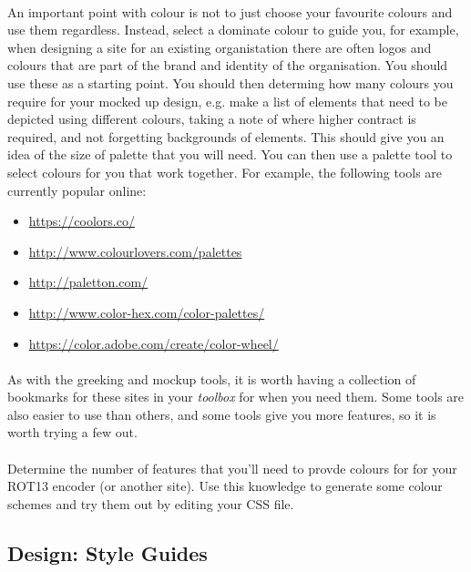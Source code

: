 \documentclass[10pt, a4paper, twosize]{article}
\begin{document}
\paragraph{} An important point with colour is not to just choose your favourite colours and use them regardless. Instead, select a dominate colour to guide you, for example, when designing a site for an existing organistation there are often logos and colours that are part of the brand and identity of the organisation. You should use these as a starting point. You should then determing how many colours you require for your mocked up design, e.g. make a list of elements that need to be depicted using different colours, taking a note of where higher contract is required, and not forgetting backgrounds of elements. This should give you an idea of the size of palette that you will need. You can then use a palette tool to select colours for you that work together. For example, the following tools are currently popular online:

\begin{itemize}
\item \url{https://coolors.co/}
\item \url{http://www.colourlovers.com/palettes}
\item \url{http://paletton.com/}
\item \url{http://www.color-hex.com/color-palettes/}
\item \url{https://color.adobe.com/create/color-wheel/}
\end{itemize}

\paragraph{} As with the greeking and mockup tools, it is worth having a collection of bookmarks for these sites in your \emph{toolbox} for when you need them. Some tools are also easier to use than others, and some tools give you more features, so it is worth trying a few out.

\paragraph{} Determine the number of features that you'll need to provde colours for for your ROT13 encoder (or another site). Use this knowledge to generate some colour schemes and try them out by editing your CSS file.


\subsection{Design: Style Guides}
\end{document}
